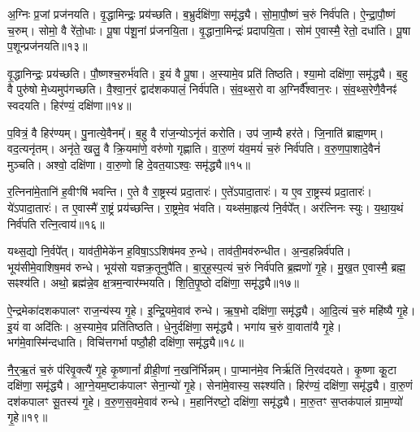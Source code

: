 अ॒ग्निः प्र॒जां प्रज॑नयति।
वृ॒द्धामिन्द्रः॒ प्रय॑च्छति।
ब॒भ्रुर्दक्षि॑णा॒ समृ॑द्ध्यै।
सो॒मा॒पौ॒ष्णं च॒रुं निर्व॑पति।
ऐ॒न्द्रा॒पौ॒ष्णं च॒रुम्।
सोमो॒ वै रे॑तो॒धाः।
पू॒षा प॑शू॒नां प्र॑जनयि॒ता।
वृ॒द्धाना॒मिन्द्रः॑ प्रदापयि॒ता।
सोम॑ ए॒वास्मै॒ रेतो॒ दधा॑ति।
पू॒षा प॒शून्प्रज॑नयति॥१३॥\ip

वृ॒द्धानिन्द्रः॒ प्रय॑च्छति।
पौ॒ष्णश्च॒रुर्भ॑वति।
इ॒यं वै पू॒षा।
अ॒स्यामे॒व प्रति॑ तिष्ठति।
श्या॒मो दक्षि॑णा॒ समृ॑द्ध्यै।
ब॒हु वै पुरु॑षो मे॒ध्यमुप॑गच्छति।
वै॒श्वा॒न॒रं द्वाद॑शकपालं॒ निर्व॑पति।
सं॒व॒थ्स॒रो वा अ॒ग्निर्वै᳚श्वान॒रः।
सं॒व॒थ्स॒रेणै॒वैनꣴ॑ स्वदयति।
हिर॑ण्यं॒ दक्षि॑णा॥१४॥\ip

प॒वित्रं॒ वै हिर॑ण्यम्।
पु॒नात्ये॒वैनम्᳚।
ब॒हु वै रा॑ज॒न्यो\-ऽनृ॑तं करोति।
उप॑ जा॒म्यै हर॑ते।
जि॒नाति॑ ब्राह्म॒णम्।
वद॒त्यनृ॑तम्।
अनृ॑ते॒ खलु॒ वै क्रि॒यमा॑णे॒ वरु॑णो गृह्णाति।
वा॒रु॒णं य॑व॒मयं॑ च॒रुं निर्व॑पति।
व॒रु॒ण॒पा॒शादे॒वैनं॑ मुञ्चति।
अश्वो॒ दक्षि॑णा।
वा॒रु॒णो हि दे॒वत॒या\-ऽश्वः॒ समृ॑द्ध्यै॥१५॥\ip\anuvakamend[ऐ॒न्द्रा॒वै॒ष्ण॒वमेका॑\-दश\-कपालं॒ यदृ॑ष॒भो दधा॑ति पू॒षा प॒शून्प्रज॑नयति॒ हिर॑ण्यं॒ दक्षि॑णा॒ दक्षि॒णैकं॑ च]

र॒त्निना॑मे॒तानि॑ ह॒वीꣳषि॑ भवन्ति।
ए॒ते वै रा॒ष्ट्रस्य॑ प्रदा॒तारः॑।
ए॒ते॑\-ऽपादा॒तारः॑।
य ए॒व रा॒ष्ट्रस्य॑ प्रदा॒तारः॑।
ये॑ऽपादा॒तारः॑।
त ए॒वास्मै॑ रा॒ष्ट्रं प्रय॑च्छन्ति।
रा॒ष्ट्रमे॒व भ॑वति।
यथ्स॑मा॒हृत्य॑ नि॒र्वपे᳚त्।
अर॑त्निनः स्युः।
य॒था॒य॒थं निर्व॑पति रत्नि॒त्वाय॑॥१६॥\ip

यथ्स॒द्यो नि॒र्वपे᳚त्।
याव॑ती॒मेके॑न ह॒विषा॒\-ऽऽशिष॑मव रु॒न्धे।
ताव॑ती॒मव॑रुन्धीत।
अ॒न्व॒हन्निर्व॑पति।
भूय॑सीमे॒वाशिष॒मव॑ रुन्धे।
भूय॑सो यज्ञक्र॒तूनुपै॑ति।
बा॒र्॒ह॒स्प॒त्यं च॒रुं निर्व॑पति ब्र॒ह्मणो॑ गृ॒हे।
मु॒ख॒त ए॒वास्मै॒ ब्रह्म॒ सꣴश्य॑ति।
अथो॒ ब्रह्म॑न्ने॒व क्ष॒त्रम॒न्वार॑म्भयति।
शि॒ति॒पृ॒ष्ठो दक्षि॑णा॒ समृ॑द्ध्यै॥१७॥\ip

ऐ॒न्द्रमेका॑\-दश\-कपालꣳ राज॒न्य॑स्य गृ॒हे।
इ॒न्द्रि॒यमे॒वाव॑ रुन्धे।
ऋ॒ष॒भो दक्षि॑णा॒ समृ॑द्ध्यै।
आ॒दि॒त्यं च॒रुं महि॑ष्यै गृ॒हे।
इ॒यं वा अदि॑तिः।
अ॒स्यामे॒व प्रति॑तिष्ठति।
धे॒नुर्दक्षि॑णा॒ समृ॑द्ध्यै।
भगा॑य च॒रुं वा॒वाता॑यै गृ॒हे।
भग॑मे॒वास्मि॑न्दधाति।
विचि॑त्तगर्भा पष्ठौ॒ही दक्षि॑णा॒ समृ॑द्ध्यै॥१८॥\ip

नै॒र्॒ऋ॒तं च॒रुं प॑रिवृ॒क्त्यै॑ गृ॒हे कृ॒ष्णानां᳚ व्रीही॒णां न॒खनि॑र्भिन्नम्।
पा॒प्मान॑मे॒व निर्\mbox{}ऋ॑तिं नि॒रव॑दयते।
कृ॒ष्णा कू॒टा दक्षि॑णा॒ समृ॑द्ध्यै।
आ॒ग्ने॒यम॒ष्टा\-क॑पालꣳ सेना॒न्यो॑ गृ॒हे।
सेना॑मे॒वास्य॒ सꣴश्य॑ति।
हिर॑ण्यं॒ दक्षि॑णा॒ समृ॑द्ध्यै।
वा॒रु॒णं दश॑कपालꣳ सू॒तस्य॑ गृ॒हे।
व॒रु॒ण॒स॒वमे॒वाव॑ रुन्धे।
म॒हानि॑रष्टो॒ दक्षि॑णा॒ समृ॑द्ध्यै।
मा॒रु॒तꣳ स॒प्तक॑पालं ग्राम॒ण्यो॑ गृ॒हे॥१९॥\ip

